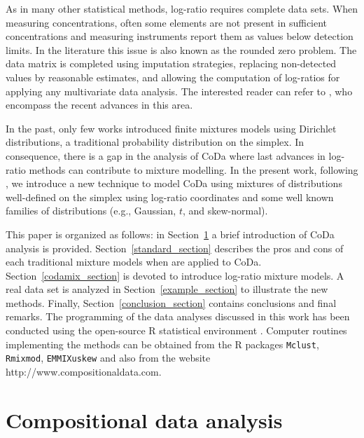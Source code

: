 \documentclass[12pt, a4paper]{article}
\begin{document}
As in many other statistical methods, log-ratio requires complete data sets. When measuring concentrations, often some elements are not present in sufficient concentrations and measuring instruments report them as values below detection limits. In the literature this issue is also known as the rounded zero problem. The data matrix is completed using imputation strategies, replacing non-detected values by reasonable estimates, and allowing the computation of log-ratios for applying any multivariate data analysis. The interested reader can refer to \cite{palarea2014compositional}, who encompass the recent advances in this area.

In the past, only few works \citep[e.g.,][]{albert1982mixtures, bouguila2004unsupervised} introduced finite mixtures models using Dirichlet distributions, a traditional probability distribution on the simplex. In consequence, there is a gap in the analysis of CoDa where last advances in log-ratio methods can contribute to mixture modelling. In the present work, following \cite{mateu2013normal}, we introduce a new technique to model CoDa using mixtures of distributions well-defined on the simplex using log-ratio coordinates and some well known families of distributions (e.g., Gaussian, $t$, and skew-normal).

This paper is organized as follows: in Section~\ref{coda_section} a brief introduction of CoDa analysis is provided. Section~\ref{standard_section} describes the pros and cons of each traditional mixture models when are applied to CoDa. Section~\ref{codamix_section} is devoted to introduce log-ratio mixture models. A real data set is analyzed in Section~\ref{example_section} to illustrate the new methods. Finally, Section~\ref{conclusion_section} contains conclusions and final remarks. The programming of the data analyses discussed in this work has been conducted using the open-source R statistical environment \citep{R2014soft}. Computer routines implementing the methods can be obtained from the R packages \texttt{Mclust}, \texttt{Rmixmod}, \texttt{EMMIXuskew} and also from the website http://www.compositionaldata.com.






\section{Compositional data analysis}
\label{coda_section}
\end{document}
